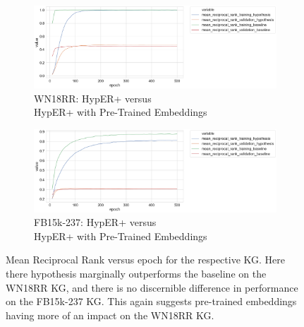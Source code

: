 \begin{figure}[H]
	\begin{subfigure}[b]{.5\linewidth}
   		\centering
    		\includegraphics[width=1.0\linewidth, height=0.6\linewidth]{WN18RR_mean_reciprocal_rank_Results_ptwv}
		\captionsetup{justification=centering}
		\caption{WN18RR: HypER+ versus \\ HypER+ with Pre-Trained Embeddings}
	\end{subfigure}
	\begin{subfigure}[b]{.5\linewidth}
   		\centering
		\includegraphics[width=1.0\linewidth, height=0.6\linewidth]{FB15k-237_mean_reciprocal_rank_Results_ptwv}
		\captionsetup{justification=centering}
		\caption{FB15k-237: HypER+ versus \\ HypER+ with Pre-Trained Embeddings}
	\end{subfigure}
	\captionsetup{justification=centering}
	\caption{Mean Reciprocal Rank versus epoch for the respective KG. Here there hypothesis marginally outperforms the baseline on the WN18RR KG, and there is no discernible difference in performance on the FB15k-237 KG. This again suggests pre-trained embeddings having more of an impact on the WN18RR KG.}
\end{figure}



